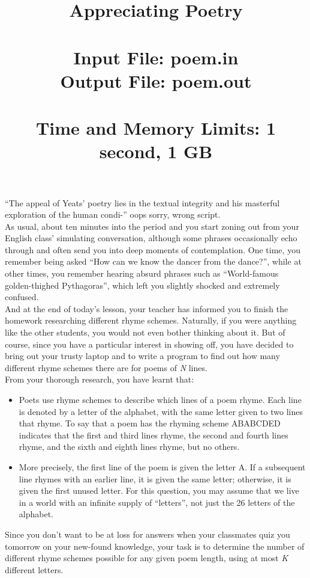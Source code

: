 \documentclass{article}
\title{\textbf{Appreciating Poetry} \\
	\ \\
	\large \textbf{Input File:} poem.in \\
	\large \textbf{Output File:} poem.out \\
	\ \\
	\textbf{Time and Memory Limits:} 1 second, 1 GB}
\date{\vspace{-10ex}}
\begin{document}
\maketitle
	
“The appeal of Yeats’ poetry lies in the textual integrity and his masterful exploration of the human condi-” oops sorry, wrong script. \\

As usual, about ten minutes into the period and you start zoning out from your English class’ simulating conversation, although some phrases occasionally echo through and often send you into deep moments of contemplation. One time, you remember being asked “How can we know the dancer from the dance?”, while at other times, you remember hearing absurd phrases such as “World-famous golden-thighed Pythagoras”, which left you slightly shocked and extremely confused. \\

And at the end of today’s lesson, your teacher has informed you to finish the homework researching different rhyme schemes. Naturally, if you were anything like the other students, you would not even bother thinking about it. But of course, since you have a particular interest in showing off, you have decided to bring out your trusty laptop and to write a program to find out how many different rhyme schemes there are for poems of \emph{N} lines. \\

From your thorough research, you have learnt that:
\begin{itemize}
	\item Poets use rhyme schemes to describe which lines of a poem rhyme. Each line is denoted by a letter of the alphabet, with the same letter given to two lines that rhyme. To say that a poem has the rhyming scheme ABABCDED indicates that the first and third lines rhyme, the second and fourth lines rhyme, and the sixth and eighth lines rhyme, but no others. 
	
	\item More precisely, the first line of the poem is given the letter A. If a subsequent line rhymes with an earlier line, it is given the same letter; otherwise, it is given the first unused letter. For this question, you may assume that we live in a world with an infinite supply of “letters”, not just the 26 letters of the alphabet. \\
\end{itemize}

Since you don't want to be at loss for answers when your classmates quiz you tomorrow on your new-found knowledge, your task is to determine the number of different rhyme schemes possible for any given poem length, using at most \emph{K} different letters. \\
\end{document}
